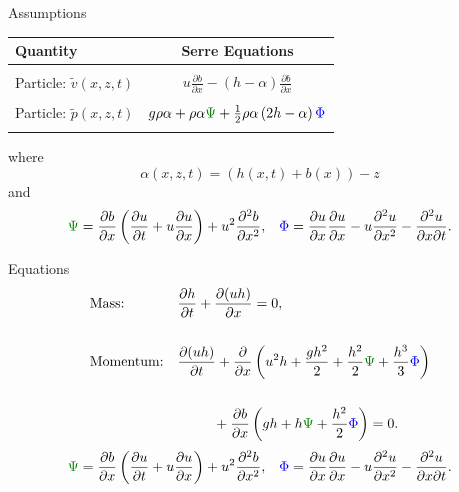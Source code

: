 \documentclass[pdf]{beamer}
\begin{document}
\begin{frame}{Assumptions}
	\bigbreak
	\begin{tabular}{l | c }
		Quantity& Serre Equations\\
		\hline \\
		Particle: $\tilde{v}(x,z,t)$ & $u\frac{\partial b}{\partial x} - (h - \alpha)\frac{\partial b}{\partial x}$ \\ &  \\ 
		Particle: $\tilde{p}(x,z,t)$& $g \rho \alpha + \rho \alpha{ \color{green!50!black}\Psi } + \frac{1}{2} \rho \alpha \left(2h - \alpha\right) { \color{blue} \Phi }$ \\ & \\ \hline
	\end{tabular}
	\bigbreak
	where $$\alpha(x,z,t) = (h(x,t) + b(x)) - z$$ 
	\bigskip
	and
	\begin{align*}
	&{ \color{green!50!black}\Psi }  = \dfrac{\partial b}{\partial x}\left(\dfrac{\partial u}{\partial t} + u\dfrac{\partial u}{\partial x} \right)  + u^2\dfrac{\partial^2 b}{\partial x^2}, &
	{ \color{blue} \Phi }  = \dfrac{\partial u }{\partial x} \dfrac{\partial u}{\partial x} -u \dfrac{\partial^2 u}{\partial x^2}  - \dfrac{\partial^2 u}{\partial x \partial t} .
	\end{align*}
\end{frame}

\begin{frame}{Equations}
	\begin{subequations}
		\begin{align*}
		&\text{Mass:} && \frac{\partial h}{\partial t} + \dfrac{\partial (uh)}{\partial x} = 0,  \\ \\
		&\text{Momentum:} &&\dfrac{\partial (uh)}{\partial t} + \dfrac{\partial}{\partial x} \left ( u^2h + \dfrac{gh^2}{2} + \dfrac{h^2}{2}{ \color{green!50!black}\Psi } + \dfrac{h^3}{3}{ { \color{blue} \Phi } }  \right )   \\ \\& &&\quad \quad \; \; +  \dfrac{\partial b}{\partial x} \left (gh +   h { \color{green!50!black}\Psi } + \dfrac{h^2}{2}{ { \color{blue} \Phi } }  \right ) = 0.
		\end{align*}
	\end{subequations}
	\begin{align*}
	&{ \color{green!50!black}\Psi }  = \dfrac{\partial b}{\partial x}\left(\dfrac{\partial u}{\partial t} + u\dfrac{\partial u}{\partial x} \right)  + u^2\dfrac{\partial^2 b}{\partial x^2}, &
	{ \color{blue} \Phi }  = \dfrac{\partial u }{\partial x} \dfrac{\partial u}{\partial x} -u \dfrac{\partial^2 u}{\partial x^2}  - \dfrac{\partial^2 u}{\partial x \partial t} .
	\end{align*}
\end{frame}
\end{document}

